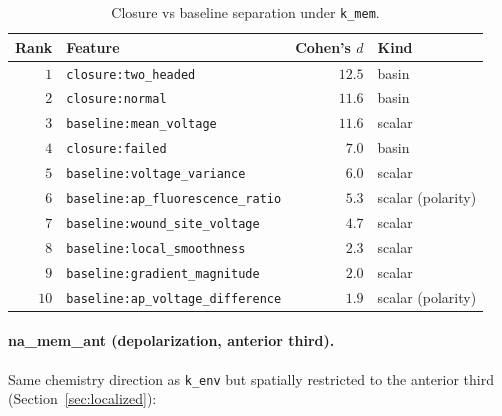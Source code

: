 \documentclass[11pt,a4paper]{article}
\begin{document}
\begin{table}[h]\centering\small
\caption{Closure vs baseline separation under \texttt{k\_mem}.}\label{tab:baselines-kmem}
\begin{tabular}{rlrl}\toprule
Rank & Feature & Cohen's $d$ & Kind \\
\midrule
$1$  & \texttt{closure:two\_headed}               & $\mathbf{12.5}$ & basin \\
$2$  & \texttt{closure:normal}                    & $11.6$  & basin \\
$3$  & \texttt{baseline:mean\_voltage}            & $11.6$  & scalar \\
$4$  & \texttt{closure:failed}                    & $7.0$   & basin \\
$5$  & \texttt{baseline:voltage\_variance}        & $6.0$   & scalar \\
$6$  & \texttt{baseline:ap\_fluorescence\_ratio}  & $5.3$   & scalar (polarity) \\
$7$  & \texttt{baseline:wound\_site\_voltage}     & $4.7$   & scalar \\
$8$  & \texttt{baseline:local\_smoothness}        & $2.3$   & scalar \\
$9$  & \texttt{baseline:gradient\_magnitude}      & $2.0$   & scalar \\
$10$ & \texttt{baseline:ap\_voltage\_difference}  & $1.9$   & scalar (polarity) \\
\bottomrule\end{tabular}
\end{table}

\paragraph{na\_mem\_ant (depolarization, anterior third).}
Same chemistry direction as \texttt{k\_env} but spatially restricted to the anterior third (Section~\ref{sec:localized}):
\end{document}
